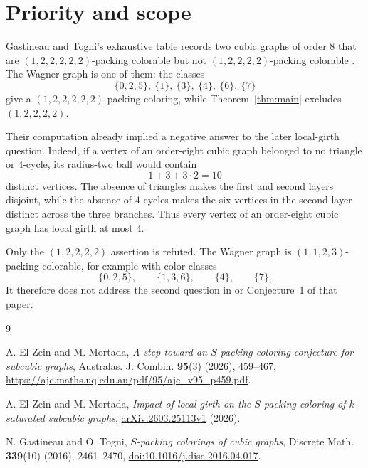 \documentclass[11pt]{amsart}
\begin{document}
\section*{Priority and scope}

Gastineau and Togni's exhaustive table records two cubic graphs of order
$8$ that are $(1,2,2,2,2,2)$-packing colorable but not
$(1,2,2,2,2)$-packing colorable \cite[Table~1]{GastineauTogni}.
The Wagner graph is one of them: the classes
\[
  \{0,2,5\},\ \{1\},\ \{3\},\ \{4\},\ \{6\},\ \{7\}
\]
give a $(1,2,2,2,2,2)$-packing coloring, while
Theorem~\ref{thm:main} excludes $(1,2,2,2,2)$.

Their computation already implied a negative answer to the later
local-girth question. Indeed, if a vertex of an order-eight cubic graph
belonged to no triangle or $4$-cycle, its radius-two ball would contain
\[
  1+3+3\cdot2=10
\]
distinct vertices. The absence of triangles makes the first and second
layers disjoint, while the absence of $4$-cycles makes the six vertices
in the second layer distinct across the three branches. Thus every
vertex of an order-eight cubic graph has local girth at most $4$.

Only the $(1,2,2,2,2)$ assertion is refuted. The Wagner graph is
$(1,1,2,3)$-packing colorable, for example with color classes
\[
  \{0,2,5\},\qquad \{1,3,6\},\qquad \{4\},\qquad \{7\}.
\]
It therefore does not address the second question in
\cite[Problem~1]{ElZeinMortadaStep} or Conjecture~1 of that paper.

\begin{thebibliography}{9}

A. El Zein and M. Mortada,
\emph{A step toward an $S$-packing coloring conjecture for subcubic graphs},
Australas. J. Combin. \textbf{95}(3) (2026), 459--467,
\url{https://ajc.maths.uq.edu.au/pdf/95/ajc_v95_p459.pdf}.

A. El Zein and M. Mortada,
\emph{Impact of local girth on the $S$-packing coloring of $k$-saturated
subcubic graphs},
\href{https://arxiv.org/abs/2603.25113v1}{arXiv:2603.25113v1} (2026).

N. Gastineau and O. Togni,
\emph{$S$-packing colorings of cubic graphs},
Discrete Math. \textbf{339}(10) (2016), 2461--2470,
\href{https://doi.org/10.1016/j.disc.2016.04.017}
{doi:10.1016/j.disc.2016.04.017}.

\end{thebibliography}
\end{document}
